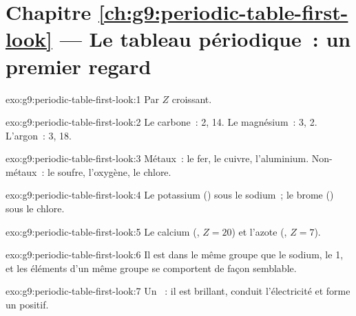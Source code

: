 \section*{Chapitre \ref{ch:g9:periodic-table-first-look} --- Le tableau périodique~: un premier regard}

\begin{solution}{exo:g9:periodic-table-first-look:1}
Par  $Z$ croissant.
\end{solution}

\begin{solution}{exo:g9:periodic-table-first-look:2}
Le carbone~:  2,  14. Le magnésium~:  3,  2.
L'argon~:  3,  18.
\end{solution}

\begin{solution}{exo:g9:periodic-table-first-look:3}
Métaux~: le fer, le cuivre, l'aluminium. Non-métaux~: le soufre,
l'oxygène, le chlore.
\end{solution}

\begin{solution}{exo:g9:periodic-table-first-look:4}
Le potassium () sous le sodium~; le brome () sous le
chlore.
\end{solution}

\begin{solution}{exo:g9:periodic-table-first-look:5}
Le calcium (, $Z = 20$) et l'azote (, $Z = 7$).
\end{solution}

\begin{solution}{exo:g9:periodic-table-first-look:6}
Il est dans le même groupe que le sodium, le  1, et les éléments
d'un même groupe se comportent de façon semblable.
\end{solution}

\begin{solution}{exo:g9:periodic-table-first-look:7}
Un ~: il est brillant, conduit l'électricité et forme un 
positif.
\end{solution}

